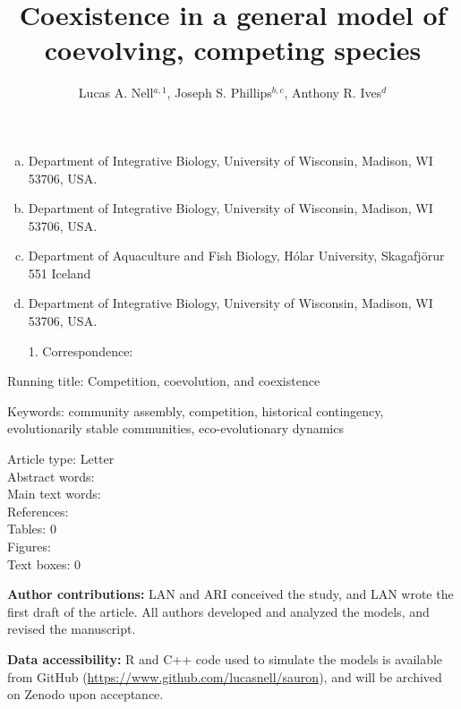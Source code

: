 \documentclass[12pt]{article}
\title{Coexistence in a general model of coevolving, competing species}
\author{Lucas A. Nell$^{a,1}$,
Joseph S. Phillips$^{b,c}$,
Anthony R. Ives$^{d}$}
\date{}
\begin{document}
\singlespacing
\linenumbers{}
\modulolinenumbers[1]

\maketitle
\author{}

\raggedright
\setlength{\parskip}{1em}


\begin{enumerate}[a.]
\item
Department of Integrative Biology, University of Wisconsin, Madison, WI 53706, USA.
\item
Department of Integrative Biology, University of Wisconsin, Madison, WI 53706, USA.
\item
Department of Aquaculture and Fish Biology, H\'{o}lar University, Skagafj\"{o}r{\dh}ur 551 Iceland
\item 
Department of Integrative Biology, University of Wisconsin, Madison, WI 53706, USA. \\[1ex]
\item[1.]
Correspondence:
\end{enumerate}




\noindent Running title: Competition, coevolution, and coexistence

\noindent Keywords: {
community assembly,
competition,
historical contingency,
evolutionarily stable communities,
eco-evolutionary dynamics}

\bigskip

\noindent Article type: Letter \\
\noindent Abstract words:  \\
\noindent Main text words:  \\ %
\noindent References: \\
\noindent Tables: 0 \\
\noindent Figures:  \\
\noindent Text boxes: 0 \\


\bigskip


\textbf{Author contributions:} LAN and ARI conceived the study,
and LAN wrote the first draft of the article.
All authors developed and analyzed the models, and revised the manuscript.

\textbf{Data accessibility:} R and C++ code used to simulate the models
is available from GitHub (\url{https://www.github.com/lucasnell/sauron}),
and will be archived on Zenodo upon acceptance.
\end{document}
